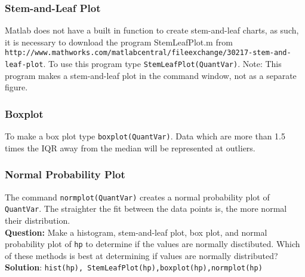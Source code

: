 \documentclass[10pt]{article}
\begin{document}
 \subsubsection{Stem-and-Leaf Plot}
 Matlab does not have a built in function to create stem-and-leaf charts, as such, it is necessary to download the program StemLeafPlot.m from\\ \texttt{http://www.mathworks.com/matlabcentral/fileexchange/30217-stem-and-leaf-plot}. To use this program type \texttt{StemLeafPlot(QuantVar)}. Note: This program makes a stem-and-leaf plot in the command window, not as a separate figure.
 \subsubsection{Boxplot}
 To make a box plot type \texttt{boxplot(QuantVar)}. Data which are more than 1.5 times the IQR away from the median will be represented at outliers.
 \subsubsection{Normal Probability Plot}
 The command \texttt{normplot(QuantVar)} creates a normal probability plot of \texttt{QuantVar}. The straighter the fit between the data points is, the more normal their distribution.
 \\\textbf{Question:}
Make a histogram, stem-and-leaf plot, box plot, and normal probability plot of \texttt{hp} to determine if the values are normally disctibuted. Which of these methods is best at determining if values are normally distributed?
 \\\textbf{Solution}: \texttt{hist(hp), StemLeafPlot(hp),boxplot(hp),normplot(hp)}
\end{document}
